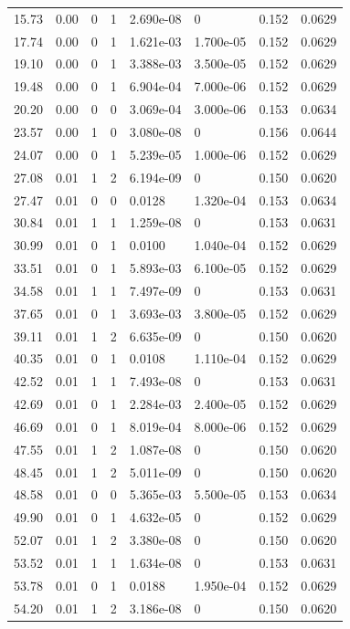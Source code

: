 \documentclass[preview]{standalone}
\begin{document}
{{\begin{tabular}{L{1.2cm}C{1.2cm} C{0.3cm}C{0.5cm} C{1.4cm}C{1.4cm} C{1.4cm}C{1.4cm}}
  15.73  &  0.00  & 0     &  1 &  2.690e-08  & 0  & 0.152 &  0.0629   \\ 
  17.74  &  0.00  & 0     &  1 &  1.621e-03  & 1.700e-05  & 0.152 &  0.0629   \\ 
  19.10  &  0.00  & 0     &  1 &  3.388e-03  & 3.500e-05  & 0.152 &  0.0629   \\ 
  19.48  &  0.00  & 0     &  1 &  6.904e-04  & 7.000e-06  & 0.152 &  0.0629   \\ 
  20.20  &  0.00  & 0     &  0 &  3.069e-04  & 3.000e-06  & 0.153 &  0.0634   \\ 
  23.57  &  0.00  & 1     &  0 &  3.080e-08  & 0  & 0.156 &  0.0644   \\ 
  24.07  &  0.00  & 0     &  1 &  5.239e-05  & 1.000e-06  & 0.152 &  0.0629   \\ 
  27.08  &  0.01  & 1     &  2 &  6.194e-09  & 0  & 0.150 &  0.0620   \\ 
  27.47  &  0.01  & 0     &  0 &  0.0128  & 1.320e-04  & 0.153 &  0.0634   \\ 
  30.84  &  0.01  & 1     &  1 &  1.259e-08  & 0  & 0.153 &  0.0631   \\ 
  30.99  &  0.01  & 0     &  1 &  0.0100  & 1.040e-04  & 0.152 &  0.0629   \\ 
  33.51  &  0.01  & 0     &  1 &  5.893e-03  & 6.100e-05  & 0.152 &  0.0629   \\ 
  34.58  &  0.01  & 1     &  1 &  7.497e-09  & 0  & 0.153 &  0.0631   \\ 
  37.65  &  0.01  & 0     &  1 &  3.693e-03  & 3.800e-05  & 0.152 &  0.0629   \\ 
  39.11  &  0.01  & 1     &  2 &  6.635e-09  & 0  & 0.150 &  0.0620   \\ 
  40.35  &  0.01  & 0     &  1 &  0.0108  & 1.110e-04  & 0.152 &  0.0629   \\ 
  42.52  &  0.01  & 1     &  1 &  7.493e-08  & 0  & 0.153 &  0.0631   \\ 
  42.69  &  0.01  & 0     &  1 &  2.284e-03  & 2.400e-05  & 0.152 &  0.0629   \\ 
  46.69  &  0.01  & 0     &  1 &  8.019e-04  & 8.000e-06  & 0.152 &  0.0629   \\ 
  47.55  &  0.01  & 1     &  2 &  1.087e-08  & 0  & 0.150 &  0.0620   \\ 
  48.45  &  0.01  & 1     &  2 &  5.011e-09  & 0  & 0.150 &  0.0620   \\ 
  48.58  &  0.01  & 0     &  0 &  5.365e-03  & 5.500e-05  & 0.153 &  0.0634   \\ 
  49.90  &  0.01  & 0     &  1 &  4.632e-05  & 0  & 0.152 &  0.0629   \\ 
  52.07  &  0.01  & 1     &  2 &  3.380e-08  & 0  & 0.150 &  0.0620   \\ 
  53.52  &  0.01  & 1     &  1 &  1.634e-08  & 0  & 0.153 &  0.0631   \\ 
  53.78  &  0.01  & 0     &  1 &  0.0188  & 1.950e-04  & 0.152 &  0.0629   \\ 
  54.20  &  0.01  & 1     &  2 &  3.186e-08  & 0  & 0.150 &  0.0620   \\ 
\hline 
\end{tabular} 

}}
\end{document}
